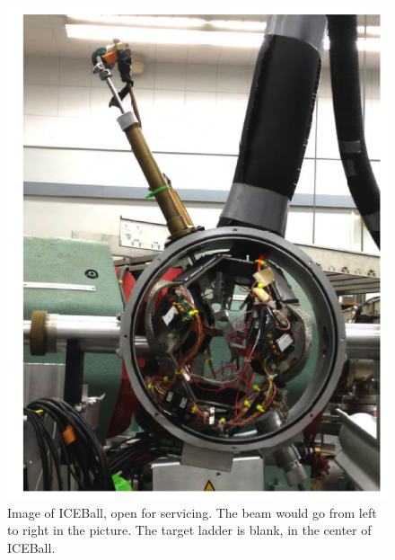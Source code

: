 \begin{figure}
    \centering
    \includegraphics[scale=0.8]{Setup_Figs/Open_ICEBall.png}  
    \caption{Image of ICEBall, open for servicing. The beam would go from left to right in the picture. The target ladder is blank, in the center of ICEBall.}
    \label{fig:open_iceball}
\end{figure}